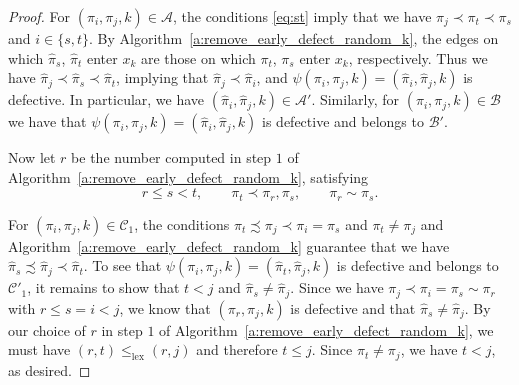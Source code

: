 \documentclass[12pt]{amsart}
\theoremstyle{definition}
\numberwithin{equation}{section}
\newcommand{\A}{\mathcal{A}}
\newcommand{\B}{\mathcal{B}}
\newcommand{\C}{\mathcal{C}}
\newcommand{\D}{\mathcal{D}}
\begin{document}
\begin{proof}
For $(\pi_i,\pi_j,k) \in \A$, the conditions \eqref{eq:st} imply that we have
$\pi_j\prec \pi_t\prec \pi_s$ and $i\in\{s,t\}$. 
By Algorithm~\ref{a:remove_early_defect_random_k}, the edges on which $\hat\pi_s$, $\hat\pi_t$ enter $x_k$ are those on which
$\pi_t$, $\pi_s$ enter $x_k$, respectively. 
Thus we have $\hat\pi_j\prec \hat\pi_s\prec \hat\pi_t$, implying that $\hat\pi_j\prec \hat\pi_i$, and
$\psi(\pi_i,\pi_j,k) = (\hat\pi_i,\hat\pi_j,k)$ is defective.
In particular, we have
$(\hat\pi_i, \hat\pi_j,k) \in 
\A'$.
Similarly, for $(\pi_i,\pi_j,k) \in \B$ we have that $\psi(\pi_i,\pi_j,k) = (\hat\pi_i,\hat\pi_j,k)$ 
is defective and 
belongs to $\B'$.

Now let $r$ be the number computed in step $1$ of Algorithm~\ref{a:remove_early_defect_random_k}, satisfying
\begin{equation}\label{eq:rst}
    r \leq s < t, \qquad \pi_t \prec \pi_r, \pi_s, \qquad \pi_r \sim \pi_s.
\end{equation}

For $(\pi_i, \pi_j, k) \in \C_1$, 
the conditions 
$\pi_t\precsim \pi_j\prec \pi_i=\pi_s$ and $\pi_t\neq \pi_j$ 
and Algorithm~\ref{a:remove_early_defect_random_k} 
guarantee that
we have
$\hat\pi_s \precsim \hat\pi_j\prec \hat\pi_t$. 
To see that $\psi(\pi_i,\pi_j,k) = (\hat\pi_t, \hat\pi_j,k)$ is defective and belongs to $\C'_1$, it remains to show that $t<j$ and 
$\hat \pi_s \neq \hat \pi_j$. 
Since we have $\pi_j \prec \pi_i=\pi_s\sim\pi_r$ with $r\leq s = i < j$, we know that $(\pi_r,\pi_j,k)$ is defective and that $\hat \pi_s \neq \hat \pi_j$. 
By our choice of $r$ in step $1$ of Algorithm~\ref{a:remove_early_defect_random_k}, we must have $(r, t)\leq_{\mathrm{lex}}(r,j)$ and therefore $t\leq j$. Since $\pi_t \neq \pi_j$, we 
have $t<j$, as desired. 


\end{proof}
\end{document}
